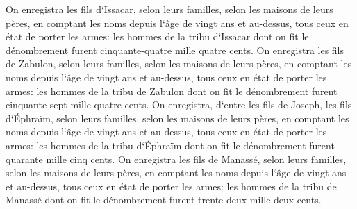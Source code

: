 \verse On enregistra les fils d`Issacar, selon leurs familles, selon les maisons de leurs pères, en comptant les noms depuis l`âge de vingt ans et au-dessus, tous ceux en état de porter les armes: 
\verse les hommes de la tribu d`Issacar dont on fit le dénombrement furent cinquante-quatre mille quatre cents. 
\verse On enregistra les fils de Zabulon, selon leurs familles, selon les maisons de leurs pères, en comptant les noms depuis l`âge de vingt ans et au-dessus, tous ceux en état de porter les armes: 
\verse les hommes de la tribu de Zabulon dont on fit le dénombrement furent cinquante-sept mille quatre cents. 
\verse On enregistra, d`entre les fils de Joseph, les fils d`Éphraïm, selon leurs familles, selon les maisons de leurs pères, en comptant les noms depuis l`âge de vingt ans et au-dessus, tous ceux en état de porter les armes: 
\verse les hommes de la tribu d`Éphraïm dont on fit le dénombrement furent quarante mille cinq cents. 
\verse On enregistra les fils de Manassé, selon leurs familles, selon les maisons de leurs pères, en comptant les noms depuis l`âge de vingt ans et au-dessus, tous ceux en état de porter les armes: 
\verse les hommes de la tribu de Manassé dont on fit le dénombrement furent trente-deux mille deux cents. 

